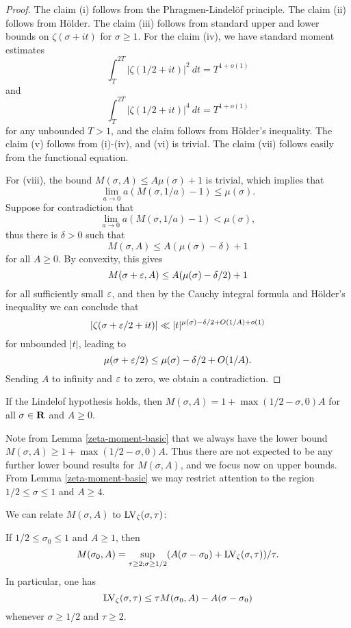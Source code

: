 \begin{proof} The claim (i) follows from the Phragmen-Lindel\"of principle.  The claim (ii) follows from H\"older.  The claim (iii) follows from standard upper and lower bounds on $\zeta(\sigma+it)$ for $\sigma \geq 1$.  For the claim (iv), we have standard moment estimates
$$ \int_T^{2T} |\zeta(1/2+it)|^2\ dt = T^{1+o(1)}$$
and
$$ \int_T^{2T} |\zeta(1/2+it)|^4\ dt = T^{1+o(1)}$$
for any unbounded $T>1$, and the claim follows from H\"older's inequality.  The claim (v) follows from (i)-(iv), and (vi) is trivial. The claim (vii) follows easily from the functional equation.

For (viii), the bound $M(\sigma,A) \leq A \mu(\sigma) + 1$ is trivial, which implies that
$$ \lim_{a \to 0} a(M(\sigma,1/a)-1) \leq \mu(\sigma).$$
Suppose for contradiction that
$$ \lim_{a \to 0} a(M(\sigma,1/a)-1) < \mu(\sigma),$$
thus there is $\delta>0$ such that
$$M(\sigma,A) \leq A (\mu(\sigma)-\delta) + 1$$
for all $A\geq 0$.  By convexity, this gives
$$M(\sigma+\varepsilon,A) \leq A (\mu(\sigma)-\delta/2) + 1$$
for all sufficiently small $\varepsilon$, and then by the Cauchy integral formula and H\"older's inequality we can conclude that
$$ |\zeta(\sigma+\varepsilon/2 +it)| \ll |t|^{\mu(\sigma)-\delta/2 + O(1/A) + o(1)} $$
for unbounded $|t|$, leading to
$$ \mu(\sigma+\varepsilon/2) \leq \mu(\sigma)-\delta/2 + O(1/A).$$
Sending $A$ to infinity and $\varepsilon$ to zero, we obtain a contradiction.
\end{proof}

\begin{corollary}\label{moment_from_lindelof} If the Lindelof hypothesis holds, then $M(\sigma,A) = 1 + \max(1/2-\sigma,0) A$ for all $\sigma \in \mathbf{R}$ and $A \geq 0$.
\end{corollary}

Note from Lemma \ref{zeta-moment-basic} that we always have the lower bound $M(\sigma,A) \geq 1 + \max(1/2-\sigma,0) A$.  Thus there are not expected to be any further lower bound results for $M(\sigma,A)$, and we focus now on upper bounds.  From Lemma \ref{zeta-moment-basic} we may restrict attention to the region $1/2 \leq \sigma \leq 1$ and $A \geq 4$.

We can relate $M(\sigma,A)$ to $\mathrm{LV}_\zeta(\sigma,\tau)$:

\begin{lemma}\label{mad}  If $1/2 \leq \sigma_0 \leq 1$ and $A \geq 1$, then
\begin{equation}\label{M-form}
 M(\sigma_0,A) = \sup_{\tau \geq 2; \sigma \geq 1/2} (A(\sigma-\sigma_0) + \mathrm{LV}_\zeta(\sigma,\tau))/\tau.
\end{equation}
In particular, one has
$$ \mathrm{LV}_\zeta(\sigma,\tau) \leq \tau M(\sigma_0,A) - A(\sigma-\sigma_0)$$
whenever $\sigma \geq 1/2$ and $\tau \geq 2$.
\end{lemma}


